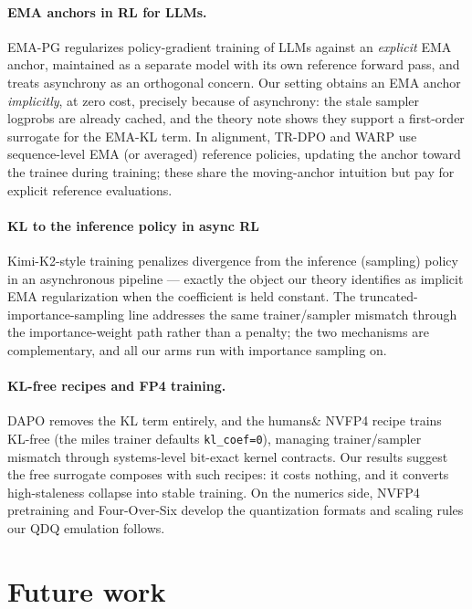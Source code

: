 \documentclass[11pt]{amsart}
\begin{document}
\paragraph{EMA anchors in RL for LLMs.} EMA-PG \cite{emapg} regularizes
policy-gradient training of LLMs against an \emph{explicit} EMA anchor,
maintained as a separate model with its own reference forward pass, and
treats asynchrony as an orthogonal concern. Our setting obtains an EMA
anchor \emph{implicitly}, at zero cost, precisely because of asynchrony: the
stale sampler logprobs are already cached, and the theory note
\cite{theorynote} shows they support a first-order surrogate for the EMA-KL
term. In alignment, TR-DPO \cite{trdpo} and WARP \cite{warp} use
sequence-level EMA (or averaged) reference policies, updating the anchor
toward the trainee during training; these share the moving-anchor intuition
but pay for explicit reference evaluations.

\paragraph{KL to the inference policy in async RL} Kimi-K2-style training
\cite{kimi} penalizes divergence from the inference (sampling) policy in an
asynchronous pipeline --- exactly the object our theory identifies as
implicit EMA regularization when the coefficient is held constant. The
truncated-importance-sampling line \cite{fengyao} addresses the same
trainer/sampler mismatch through the importance-weight path rather than a
penalty; the two mechanisms are complementary, and all our arms run with
importance sampling on.

\paragraph{KL-free recipes and FP4 training.} DAPO \cite{dapo} removes the
KL term entirely, and the humans\& NVFP4 recipe \cite{humansand} trains
KL-free (the miles trainer defaults \texttt{kl\_coef=0}), managing
trainer/sampler mismatch through systems-level bit-exact kernel contracts.
Our results suggest the free surrogate composes with such recipes: it costs
nothing, and it converts high-staleness collapse into stable training.
On the numerics side, NVFP4 pretraining \cite{nvfp4pretrain} and
Four-Over-Six \cite{fouroversix} develop the quantization formats and
scaling rules our QDQ emulation follows.

\section{Future work}
\label{sec:future}
\end{document}
